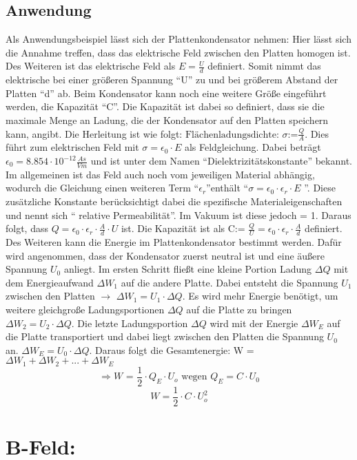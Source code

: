 \subsection{Anwendung}
Als Anwendungsbeispiel lässt sich der Plattenkondensator nehmen:
Hier lässt sich die Annahme treffen, dass das elektrische Feld zwischen den Platten homogen ist.
Des Weiteren ist das elektrische Feld als $E = \frac{U}{d}$ definiert.
Somit nimmt das elektrische bei einer größeren Spannung "`U"' zu und bei größerem Abstand der Platten "`d"' ab.
Beim Kondensator kann noch eine weitere Größe eingeführt werden, die Kapazität "`C"'.
Die Kapazität ist dabei so definiert, dass sie die maximale Menge an Ladung, die der Kondensator auf den Platten speichern kann, angibt.
Die Herleitung ist wie folgt:
$\mbox{Flächenladungsdichte: } \sigma \mbox{:=} \frac{Q}{A}$.
Dies führt zum elektrischen Feld mit $\sigma = \epsilon_0 \cdot E$ als Feldgleichung.
Dabei beträgt $\epsilon_0 = 8.854 \cdot 10^{-12} \frac{As}{Vm}$ und ist unter dem Namen "`Dielektrizitätskonstante"' bekannt.
Im allgemeinen ist das Feld auch noch vom jeweiligen Material abhängig, wodurch die Gleichung einen weiteren Term "`$\epsilon_r$"'enthält "`$\sigma = \epsilon_0 \cdot \epsilon_r \cdot E$ "'.
Diese zusätzliche Konstante berücksichtigt dabei die spezifische Materialeigenschaften und nennt sich "` relative Permeabilität"'.
Im Vakuum ist diese jedoch = 1.
Daraus folgt, dass $ Q = \epsilon_0 \cdot \epsilon_r \cdot \frac{A}{d} \cdot U$ ist.
Die Kapazität ist als $\mbox{C:= } \frac{Q}{U} = \epsilon_0 \cdot \epsilon_r \cdot \frac{A}{d}$ definiert.
Des Weiteren kann die Energie im Plattenkondensator bestimmt werden.
Dafür wird angenommen, dass der Kondensator zuerst neutral ist und eine äußere Spannung $U_0$ anliegt.
Im ersten Schritt fließt eine kleine Portion Ladung $\Delta Q$ mit dem Energieaufwand $\Delta W_1$ auf die andere Platte. Dabei entsteht die Spannung $U_1$ zwischen den Platten $\rightarrow$ $\Delta W_1 = U_1 \cdot \Delta Q$.
Es wird mehr Energie benötigt, um  weitere gleichgroße Ladungsportionen $\Delta Q$ auf die Platte zu bringen $\Delta W_2 = U_2 \cdot \Delta Q$.
Die letzte Ladungsportion $\Delta Q$ wird mit der Energie $\Delta W_E$ auf die Platte transportiert und dabei liegt zwischen den Platten die Spannung $U_0$ an. 
$\Delta W_E = U_0 \cdot \Delta Q$.
Daraus folgt die Gesamtenergie: W = $\Delta W_1 + \Delta W_2 +...+ \Delta W_E$
$$\Rightarrow W \mbox{ = } \frac{1}{2}\cdot Q_E \cdot U_o \mbox{ wegen $Q_E = C \cdot U_0$}$$
$$W= \frac{1}{2} \cdot C \cdot U_o^2$$
\section{B-Feld:}

